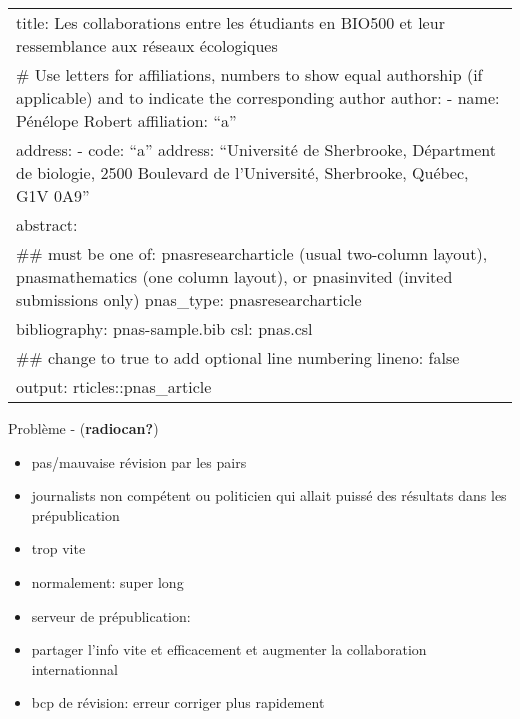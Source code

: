 \documentclass[9pt,twocolumn,twoside,]{pnas-new}
\title{}
\providecommand{\tightlist}{%
  \setlength{\itemsep}{0pt}\setlength{\parskip}{0pt}}
\begin{document}
\verticaladjustment{-2pt}



\maketitle
\thispagestyle{firststyle}


\acknow{}

\begin{longtable}[]{@{}
  >{\raggedright\arraybackslash}p{}@{}}
\toprule
\endhead
title: Les collaborations entre les étudiants en BIO500 et leur
ressemblance aux réseaux écologiques \\
\# Use letters for affiliations, numbers to show equal authorship (if
applicable) and to indicate the corresponding author author: - name:
Pénélope Robert affiliation: ``a'' \\
address: - code: ``a'' address: ``Université de Sherbrooke, Départment
de biologie, 2500 Boulevard de l'Université, Sherbrooke, Québec, G1V
0A9'' \\
abstract: \textbar{} \\
\#\# must be one of: pnasresearcharticle (usual two-column layout),
pnasmathematics (one column layout), or pnasinvited (invited submissions
only) pnas\_type: pnasresearcharticle \\
bibliography: pnas-sample.bib csl: pnas.csl \\
\#\# change to true to add optional line numbering lineno: false \\
output: rticles::pnas\_article \\
\bottomrule
\end{longtable}

Problème - (\textbf{radiocan?})

\begin{itemize}
\tightlist
\item
  pas/mauvaise révision par les pairs
\item
  journalists non compétent ou politicien qui allait puissé des
  résultats dans les prépublication
\item
  trop vite
\item
  normalement: super long
\item
  serveur de prépublication:
\item
  partager l'info vite et efficacement et augmenter la collaboration
  internationnal
\item
  bcp de révision: erreur corriger plus rapidement
\end{itemize}
\end{document}
